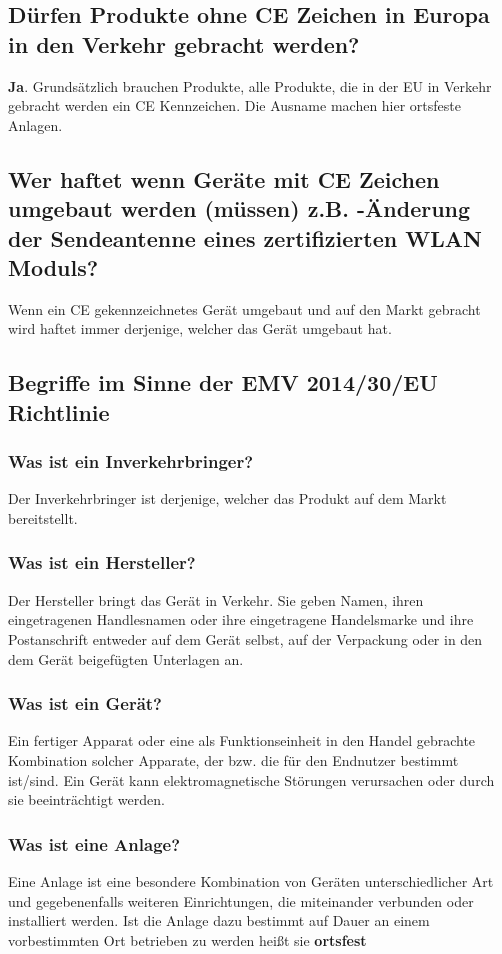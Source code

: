\subsection{Dürfen Produkte ohne CE Zeichen in Europa in den Verkehr gebracht werden?}
\textbf{Ja}. Grundsätzlich brauchen Produkte, alle Produkte, die in der EU in Verkehr gebracht werden ein CE Kennzeichen.\p
Die Ausname machen hier ortsfeste Anlagen.

\subsection{Wer haftet wenn Geräte mit CE Zeichen umgebaut werden (müssen) z.B. -Änderung der Sendeantenne eines zertifizierten WLAN Moduls?}
Wenn ein CE gekennzeichnetes Gerät umgebaut und auf den Markt gebracht wird haftet immer derjenige, welcher das Gerät umgebaut hat.

\subsection{Begriffe im Sinne der EMV 2014/30/EU Richtlinie}
\subsubsection{Was ist ein Inverkehrbringer?}
Der Inverkehrbringer ist derjenige, welcher das Produkt auf dem Markt bereitstellt.

\subsubsection{Was ist ein Hersteller?}
Der Hersteller bringt das Gerät in Verkehr. Sie geben Namen, ihren eingetragenen Handlesnamen oder ihre eingetragene Handelsmarke und ihre Postanschrift entweder auf dem Gerät selbst, auf der Verpackung oder in den dem Gerät beigefügten Unterlagen an.

\subsubsection{Was ist ein Gerät?}
Ein fertiger Apparat oder eine als Funktionseinheit in den Handel gebrachte Kombination solcher Apparate, der bzw. die für den Endnutzer bestimmt ist/sind. Ein Gerät kann elektromagnetische Störungen verursachen oder durch sie beeinträchtigt werden.

\subsubsection{Was ist eine Anlage?}
Eine Anlage ist eine besondere Kombination von Geräten unterschiedlicher Art und gegebenenfalls weiteren Einrichtungen, die miteinander verbunden oder installiert werden.\p
Ist die Anlage dazu bestimmt auf Dauer an einem vorbestimmten Ort betrieben zu werden heißt sie \textbf{ortsfest}

